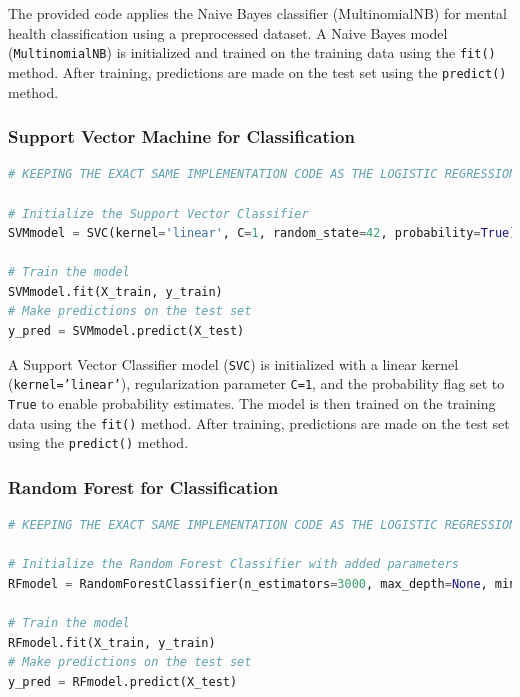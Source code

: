 \noindent
The provided code applies the Naive Bayes classifier (MultinomialNB) for mental health classification using a preprocessed dataset. A Naive Bayes model (\texttt{MultinomialNB}) is initialized and trained on the training data using the \texttt{fit()} method. After training, predictions are made on the test set using the \texttt{predict()} method.


\subsubsection{Support Vector Machine for Classification}

\begin{tcolorbox}[colback=gray!5!white, colframe=gray!80!black, boxrule=0.5pt, title=Support Vector Classifier Implementation]
    \begin{lstlisting}[language=Python]
# KEEPING THE EXACT SAME IMPLEMENTATION CODE AS THE LOGISTIC REGRESSION

# Initialize the Support Vector Classifier
SVMmodel = SVC(kernel='linear', C=1, random_state=42, probability=True)  # You can adjust parameters as needed

# Train the model
SVMmodel.fit(X_train, y_train)
# Make predictions on the test set
y_pred = SVMmodel.predict(X_test)
\end{lstlisting}
\end{tcolorbox}

\noindent
 A Support Vector Classifier model (\texttt{SVC}) is initialized with a linear kernel (\texttt{kernel='linear'}), regularization parameter \texttt{C=1}, and the probability flag set to \texttt{True} to enable probability estimates. The model is then trained on the training data using the \texttt{fit()} method. After training, predictions are made on the test set using the \texttt{predict()} method. 


\subsubsection{Random Forest for Classification}
  
\begin{tcolorbox}[colback=gray!5!white, colframe=gray!80!black, boxrule=0.5pt, title=Random Forest Classifier Implementation]
    \begin{lstlisting}[language=Python]
# KEEPING THE EXACT SAME IMPLEMENTATION CODE AS THE LOGISTIC REGRESSION

# Initialize the Random Forest Classifier with added parameters
RFmodel = RandomForestClassifier(n_estimators=3000, max_depth=None, min_samples_split=20, min_samples_leaf=1, max_features='sqrt', bootstrap=False, random_state=42)

# Train the model
RFmodel.fit(X_train, y_train)
# Make predictions on the test set
y_pred = RFmodel.predict(X_test)
    \end{lstlisting}
\end{tcolorbox}

